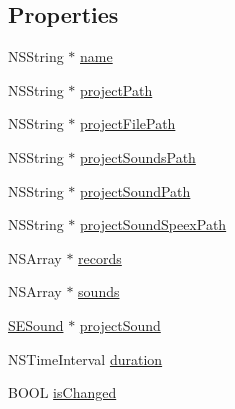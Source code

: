 \subsection*{Properties}
\begin{DoxyCompactItemize}
\item 
N\-S\-String $\ast$ \hyperlink{interface_s_e_project_adf05552fc2cf324eb3511d3bd1b8a996}{name}
\item 
N\-S\-String $\ast$ \hyperlink{interface_s_e_project_ac38834514741444f3677a4da9a1abda8}{project\-Path}
\item 
N\-S\-String $\ast$ \hyperlink{interface_s_e_project_a63b41fbd6ab7d88459052b714314082b}{project\-File\-Path}
\item 
N\-S\-String $\ast$ \hyperlink{interface_s_e_project_aed6c39bde3642e161be44d0adfb431e0}{project\-Sounds\-Path}
\item 
N\-S\-String $\ast$ \hyperlink{interface_s_e_project_abdb9d29d65636a4c6bfe8e6a4ced941e}{project\-Sound\-Path}
\item 
N\-S\-String $\ast$ \hyperlink{interface_s_e_project_ac31124fe234f12a0d4c196622aaf5039}{project\-Sound\-Speex\-Path}
\item 
N\-S\-Array $\ast$ \hyperlink{interface_s_e_project_ad1fc62c52cc1e466cf805092c8ab8288}{records}
\item 
N\-S\-Array $\ast$ \hyperlink{interface_s_e_project_a916ce006afc2e4eb7ccf40af12080de8}{sounds}
\item 
\hyperlink{interface_s_e_sound}{S\-E\-Sound} $\ast$ \hyperlink{interface_s_e_project_a7111d38adc96fa2b495395ed339fe681}{project\-Sound}
\item 
N\-S\-Time\-Interval \hyperlink{interface_s_e_project_a15abe01910f86e1629ff2dcf762e9709}{duration}
\item 
B\-O\-O\-L \hyperlink{interface_s_e_project_a4da84c0c1ef729881956646b15762cc9}{is\-Changed}
\end{DoxyCompactItemize}


